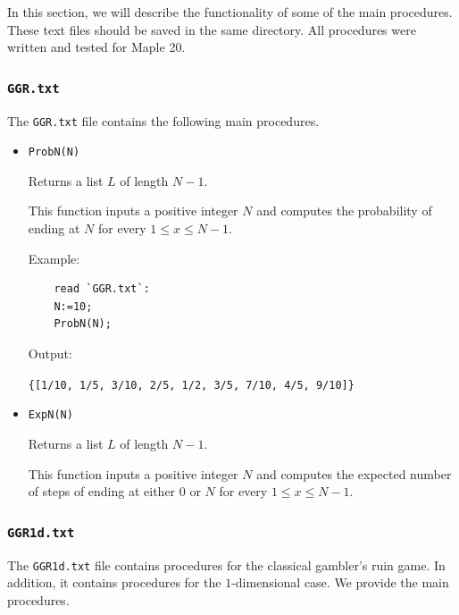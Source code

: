 \documentclass[reqno]{amsart}
\theoremstyle{definition}
\theoremstyle{definition}
\theoremstyle{remark}
\begin{document}
In this section, we will describe the functionality of
some of the main procedures. These text files should be saved in the same directory. All procedures were written and tested for Maple 20.

\subsubsection{\lstinline{GGR.txt}}
The \lstinline{GGR.txt} file contains the following main procedures.

\begin{itemize}
\item \lstinline{ProbN(N)}

    Returns a list $L$ of length $N-1$.
    
    This function inputs a positive integer $N$ and computes the probability of ending at $N$ for every $1\leq x \leq N-1$.

    Example:
    
    \begin{lstlisting}
    read `GGR.txt`:
    N:=10;
    ProbN(N);
    \end{lstlisting}
    Output:
    
    \lstinline!{[1/10, 1/5, 3/10, 2/5, 1/2, 3/5, 7/10, 4/5, 9/10]}!
    
    \item \lstinline{ExpN(N)}
    
    Returns a list $L$ of length $N-1$.
    
    This function inputs a positive integer $N$ and computes the expected number of steps of ending at either $0$ or $N$ for every $1\leq x \leq N-1$.
\end{itemize}

\subsubsection{\lstinline{GGR1d.txt}}\label{appendix:ggr1d}
The \lstinline{GGR1d.txt} file contains procedures for the classical gambler's ruin game. In addition, it contains procedures for the $1$-dimensional case. We provide the main procedures.
\end{document}
